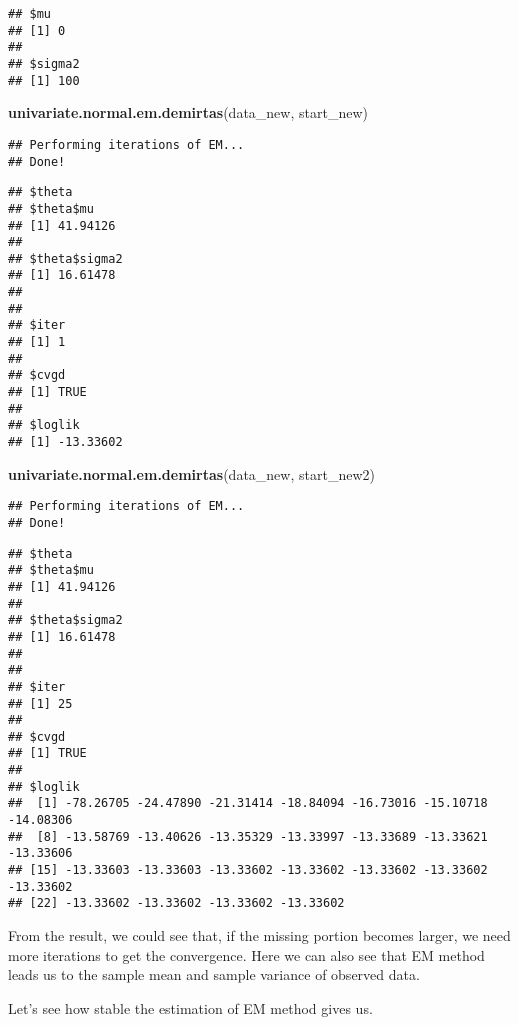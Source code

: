 \documentclass[]{article}
\newenvironment{Shaded}{\begin{snugshade}}{\end{snugshade}}
\newcommand{\KeywordTok}[1]{\textcolor[rgb]{0.13,0.29,0.53}{\textbf{#1}}}
\newcommand{\NormalTok}[1]{#1}
\begin{document}
\begin{verbatim}
## $mu
## [1] 0
## 
## $sigma2
## [1] 100
\end{verbatim}

\begin{Shaded}
\begin{Highlighting}[]
\KeywordTok{univariate.normal.em.demirtas}\NormalTok{(data_new, start_new)}
\end{Highlighting}
\end{Shaded}

\begin{verbatim}
## Performing iterations of EM... 
## Done!
\end{verbatim}

\begin{verbatim}
## $theta
## $theta$mu
## [1] 41.94126
## 
## $theta$sigma2
## [1] 16.61478
## 
## 
## $iter
## [1] 1
## 
## $cvgd
## [1] TRUE
## 
## $loglik
## [1] -13.33602
\end{verbatim}

\begin{Shaded}
\begin{Highlighting}[]
\KeywordTok{univariate.normal.em.demirtas}\NormalTok{(data_new, start_new2)}
\end{Highlighting}
\end{Shaded}

\begin{verbatim}
## Performing iterations of EM... 
## Done!
\end{verbatim}

\begin{verbatim}
## $theta
## $theta$mu
## [1] 41.94126
## 
## $theta$sigma2
## [1] 16.61478
## 
## 
## $iter
## [1] 25
## 
## $cvgd
## [1] TRUE
## 
## $loglik
##  [1] -78.26705 -24.47890 -21.31414 -18.84094 -16.73016 -15.10718 -14.08306
##  [8] -13.58769 -13.40626 -13.35329 -13.33997 -13.33689 -13.33621 -13.33606
## [15] -13.33603 -13.33603 -13.33602 -13.33602 -13.33602 -13.33602 -13.33602
## [22] -13.33602 -13.33602 -13.33602 -13.33602
\end{verbatim}

From the result, we could see that, if the missing portion becomes
larger, we need more iterations to get the convergence. Here we can also
see that EM method leads us to the sample mean and sample variance of
observed data.

Let's see how stable the estimation of EM method gives us.
\end{document}
